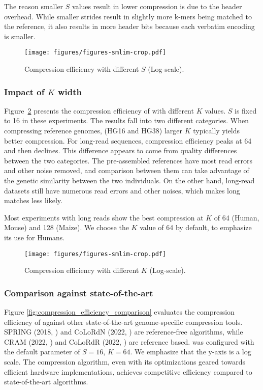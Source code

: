 The reason smaller $S$ values result in lower compression is due to the header overhead.
While smaller strides result in slightly more k-mers being matched to the reference, it also results in more header bits because each verbatim encoding is smaller.

\begin{figure}[htb]
    \centering
    \texttt{[image: figures/figures-smlim-crop.pdf]}
    \caption{Compression efficiency with different $S$ (Log-scale).}
    \label{fig:compression_efficiency_stride}
\end{figure}

\subsubsection{Impact of $K$ width}
Figure~\ref{fig:compression_efficiency_kmer} presents the compression efficiency of \name{} with different $K$ values.
$S$ is fixed to 16 in these experiments.
The results fall into two different categories.
When compressing reference genomes, (HG16 and HG38) larger $K$ typically yields better compression.
For long-read sequences, compression efficiency peaks at 64 and then declines.
This difference appears to come from quality differences between the two categories.
The pre-assembled references have most read errors and other noise removed, and comparison between them can take advantage of the genetic similarity between the two individuals.
On the other hand, long-read datasets still have numerous read errors and other noises, which makes long matches less likely.

Most experiments with long reads show the best compression at $K$ of 64 (Human, Mouse) and 128 (Maize).
We choose the $K$ value of 64 by default, to emphasize its use for Humans.

\begin{figure}[htb]
    \centering
    \texttt{[image: figures/figures-smlim-crop.pdf]}
    \caption{Compression efficiency with different $K$ (Log-scale).}
    \label{fig:compression_efficiency_kmer}
\end{figure}

\subsubsection{Comparison against state-of-the-art}
Figure \ref{fig:compression_efficiency_comparison} evaluates the compression efficiency of \name{} against other state-of-the-art genome-specific compression tools.
SPRING (2018, \cite{chandak2018spring}) and CoLoRdN (2022, \cite{kokot2022colord}) are reference-free algorithms, while CRAM (2022, \cite{bonfield2022cram}) and CoLoRdR (2022, \cite{kokot2022colord}) are reference based.
\name{} was configured with the default parameter of $S=16$, $K=64$.
We emphasize that the y-axis is a log scale.
The \name{} compression algorithm, even with its optimizations geared towards efficient hardware implementations, achieves competitive efficiency compared to state-of-the-art algorithms.

